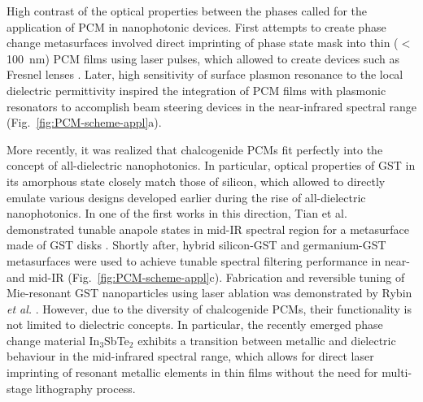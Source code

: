 \documentclass[journal=chreay,manuscript=review]{achemso}
\begin{document}
High contrast of the optical properties between the phases called for the application of PCM in nanophotonic devices. First attempts to create phase change metasurfaces involved direct imprinting of phase state mask into thin ($<$100~nm) PCM films using laser pulses, which allowed to create devices such as Fresnel lenses \cite{wang2016optically}. Later, high sensitivity of surface plasmon resonance to the local dielectric permittivity inspired the integration of PCM films with plasmonic resonators \cite{galarreta2018nonvolatile} to accomplish beam steering devices in the near-infrared spectral range (Fig.~\ref{fig:PCM-scheme-appl}a).

More recently, it was realized that chalcogenide PCMs fit perfectly into the concept of all-dielectric nanophotonics. In particular, optical properties of GST in its amorphous state closely match those of silicon, which allowed to directly emulate various designs developed earlier during the rise of all-dielectric nanophotonics\cite{kuznetsov2016optically}. In one of the first works in this direction, Tian et al. demonstrated tunable anapole states in mid-IR spectral region for a metasurface made of GST disks \cite{Tian2019active}. Shortly after, hybrid silicon-GST and germanium-GST metasurfaces were used to achieve tunable spectral filtering performance  in near- and mid-IR \cite{leitis2020all,galarreta2020reconfigurable} (Fig.~\ref{fig:PCM-scheme-appl}c). Fabrication and reversible tuning of Mie-resonant GST nanoparticles using laser ablation was demonstrated by Rybin \textit{et al.} \cite{rybin2021optically}. However, due to the diversity of chalcogenide PCMs, their functionality is not limited to dielectric concepts. In particular, the recently emerged phase change material In$_3$SbTe$_2$ exhibits a transition between metallic and dielectric behaviour in the mid-infrared spectral range, which allows for direct laser imprinting of resonant metallic elements in thin films without the need for multi-stage lithography process\cite{Hessler2021}.
\end{document}

